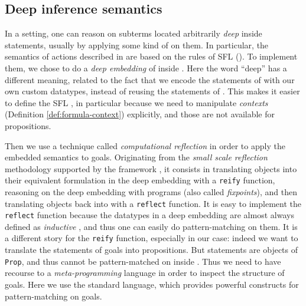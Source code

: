 \subsection{Deep inference semantics}

In a  setting, one can reason on subterms located arbitrarily
\emph{deep} inside statements, usually by applying some kind of  on them. In particular, the semantics of  actions described in
 are based on the rules of SFL (). To implement them, we
chose to do a \emph{deep embedding} of  inside .
Here the word ``deep'' has a different meaning, related to the fact that we
encode the statements of  with our own custom datatypes,
instead of reusing the statements of . This makes it easier to define
the SFL , in particular because we need to manipulate
\emph{contexts} (Definition \ref{def:formula-context}) explicitly, and those are
not available for  propositions.

Then we use a technique called \emph{computational reflection} in order to apply
the embedded  semantics to  goals. Originating from the
\emph{small scale reflection} methodology supported by the {\ssreflect}
framework \cite{SSR}, it consists in translating  objects into their
equivalent formulation in the deep embedding with a \texttt{reify} function,
reasoning on the deep embedding with  programs (also called
\emph{fixpoints}), and then translating objects back into  with a
\texttt{reflect} function. It is easy to implement the \texttt{reflect} function
because the datatypes in a deep embedding are almost always defined as
\emph{inductive} , and thus one can easily do pattern-matching on them. It
is a different story for the \texttt{reify} function, especially in our case:
indeed we want to translate the statements of  goals into 
propositions. But  statements are objects of  \texttt{Prop}, and thus
cannot be pattern-matched on inside .
Thus we need to have recourse to a \emph{meta-programming} language in order to
inspect the structure of  goals. Here we use the standard {\ltac} language,
which provides powerful constructs for pattern-matching on goals.

